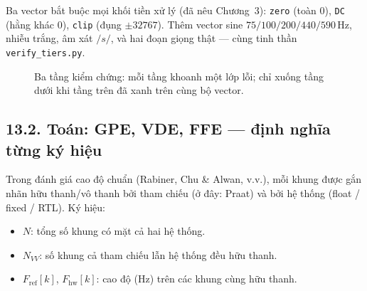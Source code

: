 Ba vector bắt buộc mọi khối tiền xử lý (đã nêu Chương~3): \texttt{zero} (toàn $0$), \texttt{DC} (hằng khác $0$), \texttt{clip} (đụng $\pm 32767$). Thêm vector sine $75/100/200/440/590\,\text{Hz}$, nhiễu trắng, âm xát $/s/$, và hai đoạn giọng thật --- cùng tinh thần \texttt{verify\_tiers.py}.

\begin{figure}[H]
\centering
{}
\caption{Ba tầng kiểm chứng: mỗi tầng khoanh một lớp lỗi; chỉ xuống tầng dưới khi tầng trên đã xanh trên cùng bộ vector.}
\label{fig:ch13_three_tiers}
\end{figure}

\subsection*{13.2. Toán: GPE, VDE, FFE --- định nghĩa từng ký hiệu}

Trong đánh giá cao độ chuẩn (Rabiner, Chu \& Alwan, v.v.), mỗi khung được gắn nhãn hữu thanh/vô thanh bởi tham chiếu (ở đây: Praat) và bởi hệ thống (float / fixed / RTL). Ký hiệu:
\begin{itemize}[leftmargin=1.4em]
    \item $N$: tổng số khung có mặt cả hai hệ thống.
    \item $N_{VV}$: số khung cả tham chiếu lẫn hệ thống đều hữu thanh.
    \item $F_{\mathrm{ref}}[k]$, $F_{\mathrm{hw}}[k]$: cao độ (Hz) trên các khung cùng hữu thanh.
\end{itemize}

